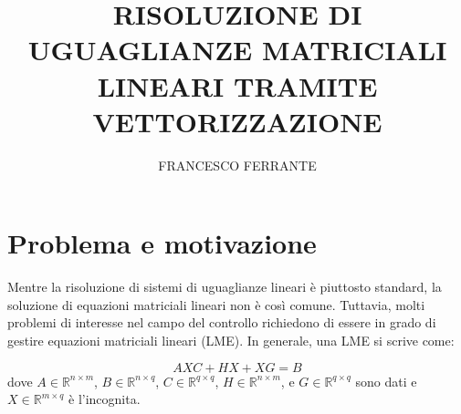\documentclass[11pt, a4paper]{article}
\title{RISOLUZIONE DI UGUAGLIANZE MATRICIALI LINEARI TRAMITE VETTORIZZAZIONE}
\author{FRANCESCO FERRANTE}
\date{}
\begin{document}
\maketitle

\section{Problema e motivazione}
Mentre la risoluzione di sistemi di uguaglianze lineari è piuttosto standard, la soluzione di equazioni matriciali lineari non è così comune. Tuttavia, molti problemi di interesse nel campo del controllo richiedono di essere in grado di gestire equazioni matriciali lineari (LME). In generale, una LME si scrive come:


\begin{equation}
AXC + HX + XG = B
\end{equation}
dove $A \in \mathbb{R}^{n \times m}$, $B \in \mathbb{R}^{n \times q}$, $C \in \mathbb{R}^{q \times q}$, $H \in \mathbb{R}^{n \times m}$, e $G \in \mathbb{R}^{q \times q}$ sono dati e $X \in \mathbb{R}^{m \times q}$ è l'incognita.
\end{document}
